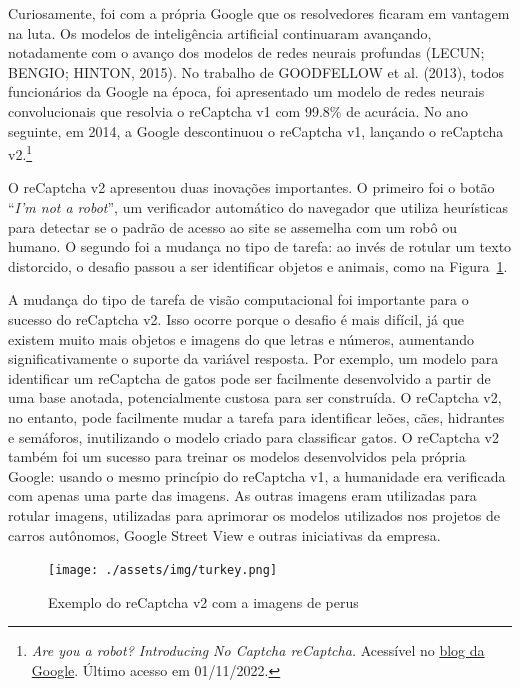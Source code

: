 \documentclass[12pt,twoside,brazilian]{book}
\begin{document}
Curiosamente, foi com a própria Google que os resolvedores ficaram em
vantagem na luta. Os modelos de inteligência artificial continuaram
avançando, notadamente com o avanço dos modelos de redes neurais
profundas (LECUN; BENGIO; HINTON, 2015). No trabalho de GOODFELLOW et
al. (2013), todos funcionários da Google na época, foi apresentado um
modelo de redes neurais convolucionais que resolvia o reCaptcha v1 com
99.8\% de acurácia. No ano seguinte, em 2014, a Google descontinuou o
reCaptcha v1, lançando o reCaptcha v2.\footnote{\emph{Are you a robot?
  Introducing No Captcha reCaptcha.} Acessível no
  \href{https://security.googleblog.com/2014/12/are-you-robot-introducing-no-captcha.html}{blog
  da Google}. Último acesso em 01/11/2022.}

O reCaptcha v2 apresentou duas inovações importantes. O primeiro foi o
botão ``\emph{I'm not a robot}'', um verificador automático do navegador
que utiliza heurísticas para detectar se o padrão de acesso ao site se
assemelha com um robô ou humano. O segundo foi a mudança no tipo de
tarefa: ao invés de rotular um texto distorcido, o desafio passou a ser
identificar objetos e animais, como na Figura~\ref{fig-turkey}.

A mudança do tipo de tarefa de visão computacional foi importante para o
sucesso do reCaptcha v2. Isso ocorre porque o desafio é mais difícil, já
que existem muito mais objetos e imagens do que letras e números,
aumentando significativamente o suporte da variável resposta. Por
exemplo, um modelo para identificar um reCaptcha de gatos pode ser
facilmente desenvolvido a partir de uma base anotada, potencialmente
custosa para ser construída. O reCaptcha v2, no entanto, pode facilmente
mudar a tarefa para identificar leões, cães, hidrantes e semáforos,
inutilizando o modelo criado para classificar gatos. O reCaptcha v2
também foi um sucesso para treinar os modelos desenvolvidos pela própria
Google: usando o mesmo princípio do reCaptcha v1, a humanidade era
verificada com apenas uma parte das imagens. As outras imagens eram
utilizadas para rotular imagens, utilizadas para aprimorar os modelos
utilizados nos projetos de carros autônomos, Google Street View e outras
iniciativas da empresa.

\begin{figure}

{\centering \texttt{[image: ./assets/img/turkey.png]}

}

\caption{\label{fig-turkey}Exemplo do reCaptcha v2 com a imagens de
perus}

\end{figure}
\end{document}
